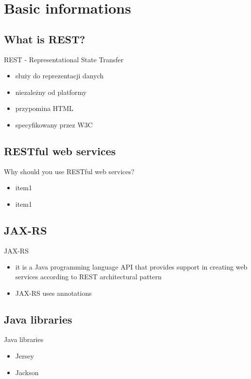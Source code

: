 \section{Basic informations}

\subsection{What is REST?}
	\begin{frame}{REST - Representational State Transfer}
		    	\begin{itemize}
				  \item służy do reprezentacji danych
				  \item niezależny od platformy
				  \item przypomina HTML 
				  \item specyfikowany przez W3C   
				\end{itemize}
	\end{frame}
	
\subsection{RESTful web services} 
	\begin{frame}{Why should you use RESTful web services?}
    	\begin{itemize}
			\item item1
			\item item1
		\end{itemize}
	\end{frame}
  
\subsection{JAX-RS}
	\begin{frame}{JAX-RS}
    	\begin{itemize}
			\item it is a Java programming language API that provides support in creating web services according to REST architectural pattern
			\item JAX-RS uses annotations
		\end{itemize}
	\end{frame}
	
\subsection{Java libraries}
	\begin{frame}{Java libraries}
		\begin{itemize}
			\item Jersey
			\item Jackson
		\end{itemize}
	\end{frame}
	
	
